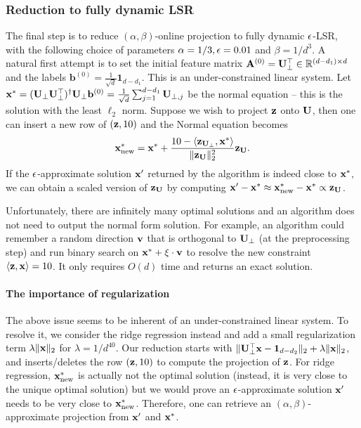 \subsubsection{Reduction to fully dynamic LSR}
The final step is to reduce $(\alpha, \beta)$-online projection to fully dynamic $\epsilon$-LSR, with the following choice of parameters $\alpha = 1/3, \epsilon= 0.01$ and $\beta = 1/d^3$. A natural first attempt is to set the initial feature matrix $\mathbf{A}^{(0)} = \mathbf{U}_{\perp}^{\top} \in \mathbb{R}^{(d-d_1)\times d}$ and the labels $\mathbf{b}^{(0)} = \frac{1}{\sqrt{d}}\mathbf{1}_{d-d_1}$. This is an under-constrained linear system. Let 
$
\mathbf{x}^{*} = (\mathbf{U}_{\perp}\mathbf{U}_{\perp}^\top)^{\dagger}\mathbf{U}_{\perp}\mathbf{b}^{(0)} = \frac{1}{\sqrt{d}}\sum_{j=1}^{d-d_1}\mathbf{U}_{\perp, j}
$
be the normal equation -- this is the solution with the least $\ell_2$ norm. Suppose we wish to project $\mathbf{z}$ onto $\mathbf{U}$, then one can insert a new row of $(\mathbf{z}, 10)$ and the Normal equation becomes 
\[
\mathbf{x}^{*}_{\operatorname{new}} = \mathbf{x}^{*} +  \frac{10 - \langle \mathbf{z}_{\mathbf{U}_{\perp}}, \mathbf{x}^{*} \rangle}{\|\mathbf{z}_{\mathbf{U}}\|_2^2} \mathbf{z}_{\mathbf{U}}.
\]
If the $\epsilon$-approximate solution $\mathbf{x}'$ returned by the algorithm is indeed close to $\mathbf{x}^{*}$, we can obtain a scaled version of $\mathbf{z}_{\mathbf{U}}$ by computing $\mathbf{x}' - \mathbf{x}^{*} \approx \mathbf{x}^{*}_{\operatorname{new}} - \mathbf{x}^{*} \propto \mathbf{z}_{\mathbf{U}}$. 

Unfortunately, there are infinitely many optimal solutions and an algorithm does not need to output the normal form solution.
For example, an algorithm could remember a random direction $\mathbf{v}$ that is orthogonal to $\mathbf{U}_{\perp}$ (at the preprocessing step) and run binary search on $\mathbf{x}^{*} + \xi \cdot \mathbf{v}$ to resolve the new constraint $\langle \mathbf{z} , \mathbf{x} \rangle = 10$. It only requires $O(d)$ time and returns an exact solution. 


\paragraph{The importance of regularization} The above issue seems to be inherent of an under-constrained linear system.
To resolve it, we consider the ridge regression instead and add a small regularization term $\lambda \|\mathbf{x}\|_2$ for $\lambda = 1/d^{40}$. 
Our reduction starts with $\|\mathbf{U}_{\perp}^\top \mathbf{x} - \mathbf{1}_{d-d_2}\|_2 + \lambda \|\mathbf{x}\|_2$, and inserts/deletes the row $(\mathbf{z} , 10)$ to compute the projection of $\mathbf{z}$. For ridge regression, $\mathbf{x}^{*}_{\operatorname{new}}$ is actually not the optimal solution (instead, it is very close to the unique optimal solution) but we would prove an $\epsilon$-approximate solution $\mathbf{x}'$ needs to be very close to $\mathbf{x}_{\operatorname{new}}^{*}$. Therefore, one can retrieve an $(\alpha, \beta)$-approximate projection from $\mathbf{x}'$ and $\mathbf{x}^{*}$. 

